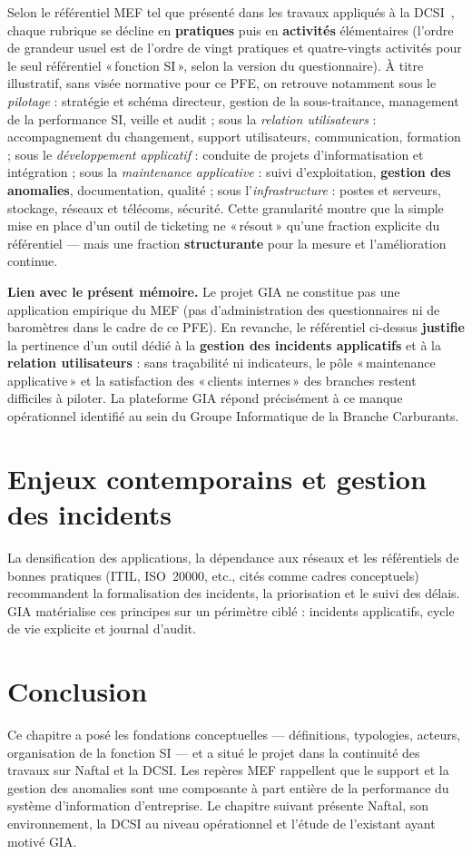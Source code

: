 Selon le référentiel MEF tel que présenté dans les travaux appliqués à la DCSI~\cite{meghari2014},
chaque rubrique se décline en \textbf{pratiques} puis en \textbf{activités} élémentaires (l'ordre
de grandeur usuel est de l'ordre de vingt pratiques et quatre-vingts activités pour le seul
référentiel «\,fonction SI\,», selon la version du questionnaire). À titre illustratif, sans visée
normative pour ce PFE, on retrouve notamment sous le \emph{pilotage} : stratégie et schéma
directeur, gestion de la sous-traitance, management de la performance SI, veille et audit ; sous
la \emph{relation utilisateurs} : accompagnement du changement, support utilisateurs, communication,
formation ; sous le \emph{développement applicatif} : conduite de projets d'informatisation et
intégration ; sous la \emph{maintenance applicative} : suivi d'exploitation, \textbf{gestion des
anomalies}, documentation, qualité ; sous l'\emph{infrastructure} : postes et serveurs, stockage,
réseaux et télécoms, sécurité. Cette granularité montre que la simple mise en place d'un outil de
ticketing ne «\,résout\,» qu'une fraction explicite du référentiel — mais une fraction
\textbf{structurante} pour la mesure et l'amélioration continue.

\medskip
\noindent\textbf{Lien avec le présent mémoire.} Le projet GIA ne constitue pas une application
empirique du MEF (pas d'administration des questionnaires ni de baromètres dans le cadre de ce
PFE). En revanche, le référentiel ci-dessus \textbf{justifie} la pertinence d'un outil dédié à la
\textbf{gestion des incidents applicatifs} et à la \textbf{relation utilisateurs} : sans
traçabilité ni indicateurs, le pôle «\,maintenance applicative\,» et la satisfaction des «\,clients
internes\,» des branches restent difficiles à piloter. La plateforme GIA répond précisément à ce
manque opérationnel identifié au sein du Groupe Informatique de la Branche Carburants.

\section{Enjeux contemporains et gestion des incidents}
La densification des applications, la dépendance aux réseaux et les référentiels de bonnes
pratiques (ITIL, ISO~20000, etc., cités comme cadres conceptuels) recommandent la formalisation
des incidents, la priorisation et le suivi des délais. GIA matérialise ces principes sur un
périmètre ciblé : incidents applicatifs, cycle de vie explicite et journal d'audit.

\section{Conclusion}
Ce chapitre a posé les fondations conceptuelles — définitions, typologies, acteurs, organisation
de la fonction SI — et a situé le projet dans la continuité des travaux sur Naftal et la DCSI.
Les repères MEF rappellent que le support et la gestion des anomalies sont une composante à part
entière de la performance du système d'information d'entreprise. Le chapitre suivant présente
Naftal, son environnement, la DCSI au niveau opérationnel et l'étude de l'existant ayant motivé
GIA.
